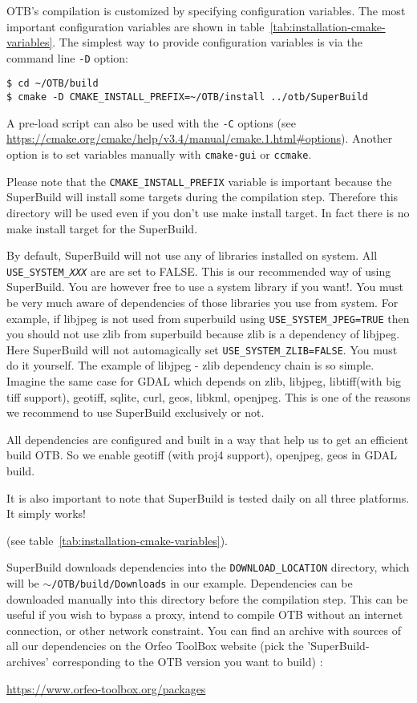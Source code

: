OTB's compilation is customized by specifying configuration variables.  The most
important configuration variables are shown in
table~\ref{tab:installation-cmake-variables}.  The simplest way to provide
configuration variables is via the command line \texttt{-D} option:
\begin{verbatim}
$ cd ~/OTB/build
$ cmake -D CMAKE_INSTALL_PREFIX=~/OTB/install ../otb/SuperBuild
\end{verbatim}
A pre-load script can also be used with the \texttt{-C} options (see
\url{https://cmake.org/cmake/help/v3.4/manual/cmake.1.html#options}).
Another option is to set variables manually with \texttt{cmake-gui}
or \texttt{ccmake}.

Please note that the \texttt{CMAKE\_INSTALL\_PREFIX} variable is important
because the SuperBuild will install some targets during the compilation step.
Therefore this directory will be used even if you don't use make install target.
In fact there is no make install target for the SuperBuild.

By default, SuperBuild will not use any of libraries installed on
system. All \texttt{USE\_SYSTEM\_\textit{XXX}} are are set to FALSE. This is our
recommended way of using SuperBuild. You are however free to use a system
library if you want!. You must be very much aware of dependencies of those
libraries you use from system. For example, if libjpeg is not used from
superbuild using \texttt{USE\_SYSTEM\_JPEG=TRUE} then you should not use zlib
from superbuild because zlib is a dependency of libjpeg. Here SuperBuild will
not automagically set \texttt{USE\_SYSTEM\_ZLIB=FALSE}.  You must do it
yourself. The example of libjpeg - zlib dependency chain is so simple.  Imagine
the same case for GDAL which depends on zlib, libjpeg, libtiff(with big tiff
support), geotiff, sqlite, curl, geos, libkml, openjpeg. This is one of the
reasons we recommend to use SuperBuild exclusively or not.

All dependencies are configured and built in a way that help us to get an
efficient build OTB.  So we enable geotiff (with proj4 support), openjpeg, geos
in GDAL build.

It is also important to note that SuperBuild is tested daily on all three
platforms. It simply works!

(see table~\ref{tab:installation-cmake-variables}).

SuperBuild downloads dependencies into the \texttt{DOWNLOAD\_LOCATION}
directory, which will be
\texttt{$\sim$/OTB/build/Downloads} in our example.
Dependencies can be downloaded manually into this directory before the
compilation step.  This can be useful if you wish to bypass a proxy, intend to
compile OTB without an internet connection, or other network constraint. You can
find an archive with sources of all our dependencies on the Orfeo ToolBox
website (pick the 'SuperBuild-archives' corresponding to the OTB version you
want to build) :
\begin{center}
\url{https://www.orfeo-toolbox.org/packages}
\end{center}

